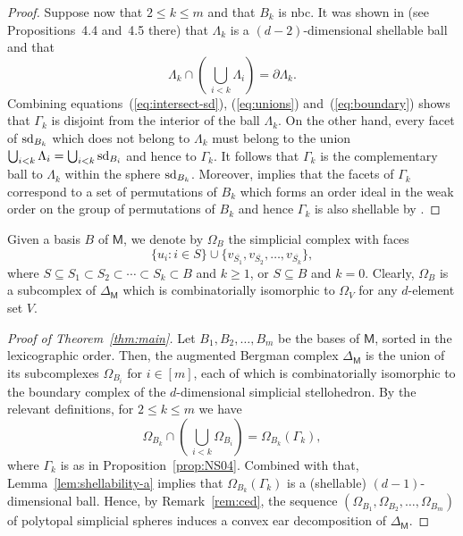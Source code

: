 \documentclass[11pt]{amsart}
\theoremstyle{theorems}
\theoremstyle{definition}
\newcommand{\sd}{{\rm sd}}
\newcommand{\M}{{\mathsf{M}}}
\begin{document}
\begin{proof}
    Suppose now that $2 \le k \le m$ and that $B_k$ is 
    nbc. It was shown in \cite[Section~4]{NS04} (see 
    Propositions~4.4 and~4.5 there) that $\Lambda_k$ 
    is a $(d-2)$-dimensional shellable ball and that 
    \begin{equation} \label{eq:boundary}
      \Lambda_k \cap \left( \, \bigcup_{i<k} 
      \Lambda_i \right) = \partial \Lambda_k.
    \end{equation}
    Combining equations~(\ref{eq:intersect-sd}), 
    (\ref{eq:unions}) and~(\ref{eq:boundary}) shows 
    that $\Gamma_k$ is disjoint from the interior of 
    the ball $\Lambda_k$. On the other hand, every 
    facet of $\sd_{B_k}$ which does not 
    belong to $\Lambda_k$ must belong to the union 
    $\bigcup_{i<k} \Lambda_i = \bigcup_{i<k} \sd_{B_i}$
    and hence to $\Gamma_k$. It follows that 
    $\Gamma_k$ is the complementary ball to 
    $\Lambda_k$ within the sphere $\sd_{B_k}$.
    Moreover, \cite[Lemma~4.3]{NS04} implies that 
    the facets of $\Gamma_k$ correspond to a set of 
    permutations of $B_k$ which forms an order ideal 
    in the weak order on the group of permutations 
    of $B_k$ and hence $\Gamma_k$ is also shellable 
    by \cite[Theorem~2.1]{Bj84}. 
\end{proof}

Given a basis $B$ of $\M$, we denote by $\Omega_B$ 
the simplicial complex with faces
%
\[ \{u_i : i \in S\} \cup \{ v_{\overline{S_1}}, 
     v_{\overline{S_2}},\dots,v_{\overline{S_k}} 
	 \}, \]
%
where $S \subseteq S_1 \subset S_2 \subset \cdots 
\subset S_k \subset B$ and $k \ge 1$, or $S 
\subseteq B$ and $k = 0$. Clearly, $\Omega_B$ is 
a subcomplex of $\Delta_{\M}$ which is 
combinatorially isomorphic to $\Omega_V$ for any 
$d$-element set $V$. 


\begin{proof}[Proof of Theorem~\ref{thm:main}]
Let $B_1, B_2,\dots,B_m$ be the bases of $\M$, 
sorted in the lexicographic order. Then, the 
augmented Bergman complex
$\Delta_{\M}$ is the union of its subcomplexes 
$\Omega_{B_i}$ for $i \in [m]$, each of which is 
combinatorially isomorphic to the boundary complex 
of the $d$-dimensional simplicial stellohedron. 
By the relevant definitions, for $2 \le k \le m$ 
we have
%
\begin{equation} \label{eq:intersect}
  \Omega_{B_k} \cap \left( \, \bigcup_{i<k} 
  \Omega_{B_i} \right) = \Omega_{B_k} (\Gamma_k), 
\end{equation}
% 
where $\Gamma_k$ is as in 
Proposition~\ref{prop:NS04}. Combined with that, 
Lemma~\ref{lem:shellability-a} implies that 
$\Omega_{B_k} (\Gamma_k)$ is a (shellable) 
$(d-1)$-dimensional ball. Hence, by Remark~\ref{rem:ced}, 
the sequence $(\Omega_{B_1}, \Omega_{B_2},\dots,\Omega_{B_m})$ 
of polytopal simplicial spheres induces a convex ear 
decomposition of $\Delta_{\M}$. 
\end{proof}
\end{document}
